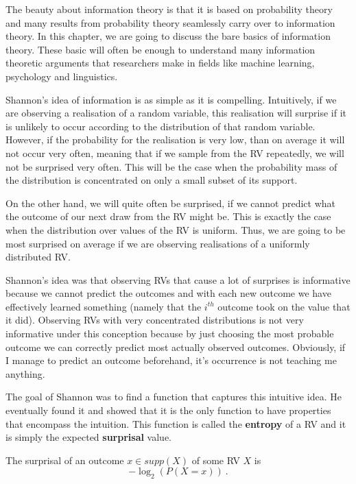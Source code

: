 The beauty about information theory is that it is based on probability theory and many results from probability theory seamlessly carry over to information theory.
In this chapter, we are going to discuss the bare basics of information theory. These basic will often be enough to understand many information theoretic arguments
that researchers make in fields like machine learning, psychology and linguistics.

Shannon's idea of information is as simple as it is compelling. Intuitively, if we are observing a realisation of a random variable, this realisation will surprise
if it is unlikely to occur according to the distribution of that random variable. However, if the probability for the realisation is very low, than on average it
will not occur very often, meaning that if we sample from the RV repeatedly, we will not be surprised very often. This will be the case when the probability
mass of the distribution is concentrated on only a small subset of its support. 

On the other hand, we will quite often be surprised,
if we cannot predict what the outcome of our next draw from the RV might be. This is exactly the case when the distribution over values of the RV is uniform. Thus,
we are going to be most surprised on average if we are observing realisations of a uniformly distributed RV.

Shannon's idea was that observing RVs that cause a lot of surprises is informative because we cannot predict the outcomes and with each new outcome we have effectively
learned something  (namely that the $ i^{th} $ outcome took on the value that it did). Observing RVs with very concentrated distributions is not very informative
under this conception because by just choosing the most probable outcome we can correctly predict most actually observed outcomes. Obviously, if I manage to predict
an outcome beforehand, it's occurrence is not teaching me anything.

The goal of Shannon was to find a function that captures this intuitive idea. He eventually found it and showed that it is the only function to have properties
that encompass the intuition. This function is called the \textbf{entropy} of a RV and it is simply the expected \textbf{surprisal} value.

\begin{Definition}[Surprisal]
The surprisal of an outcome $ x \in supp(X) $ of some RV $ X $ is
$$ -\log_{2}(P(X=x)) \ . $$
\end{Definition} 

